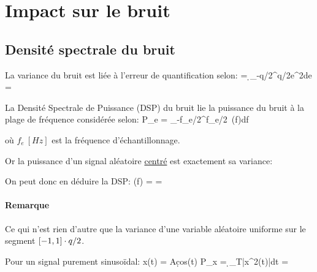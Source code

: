 
\newpage
\section{Impact sur le bruit}


\subsection{Densité spectrale du bruit}

\bdefbox
    La variance du bruit est liée à l'erreur de quantification selon:
    \be
         = \d \int_{-q/2}^{q/2}e^2de = 
    \ee

    La Densité Spectrale de Puissance (DSP) du bruit lie la puissance du bruit
    à la plage de fréquence considérée selon:
    \be
        P_e = \int_{-f_e/2}^{f_e/2}~\gamma(f)df \tq \gamma\equiv [W/Hz]
    \ee

    où $f_e~[Hz]$ est la fréquence d'échantillonnage.
\edefbox

Or la puissance d'un signal aléatoire \underline{centré} est exactement sa variance:
\be
\ee

On peut donc en déduire la DSP:
\be
    \gamma(f) =  = 
\ee

\paragraph{Remarque}
Ce qui n'est rien d'autre que la variance d'une variable aléatoire uniforme
sur le segment $[-1,1]\cdot q/2$.

\bdbox
    Pour un signal purement sinusoïdal:
    \be
        x(t) = A\d cos(\omega t) \implies
        P_x = \d\int_T|x^2(t)|dt = 
    \ee

